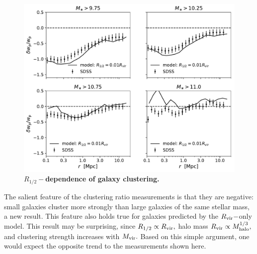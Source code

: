 \documentclass[usenatbib,usegraphicx,letterpaper]{mn2e}
\newcommand{\rhalf}{R_{1/2}}
\newcommand{\mstar}{M_{\ast}}
\newcommand{\mvir}{M_{\rm vir}}
\newcommand{\mhalo}{M_{\rm halo}}
\newcommand{\rvir}{R_{\rm vir}}
\newcommand{\wproj}{w_{\rm p}}
\begin{document}
\begin{figure}
\centering
\includegraphics[width=12cm]{FIGS/rvir_only_wp_ratios.pdf}
\caption{
{\bf $\rhalf-$dependence of galaxy clustering.}
}
\label{fig:clustering_ratio_upshot}
\end{figure}

The salient feature of the clustering ratio measurements is that they are negative: small galaxies cluster more strongly than large galaxies of the same stellar mass, a new result. This feature also holds true for galaxies predicted by the $\rvir-$only model. This result may be surprising, since $\rhalf\propto\rvir,$ halo mass $\rvir\propto\mhalo^{1/3},$ and clustering strength increases with $\mvir.$ Based on this simple argument, one would expect the opposite trend to the measurements shown here.
\end{document}
